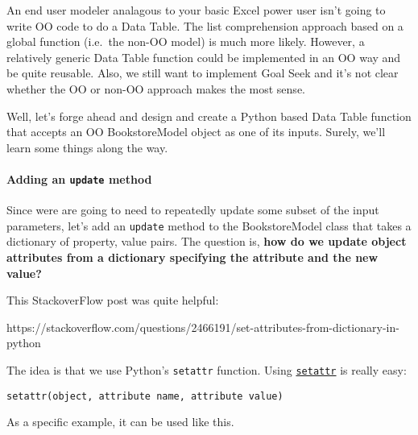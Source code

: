 \documentclass[11pt]{article}
\begin{document}
An end user modeler analagous to your basic Excel power user isn't going
to write OO code to do a Data Table. The list comprehension approach
based on a global function (i.e.~the non-OO model) is much more likely.
However, a relatively generic Data Table function could be implemented
in an OO way and be quite reusable. Also, we still want to implement
Goal Seek and it's not clear whether the OO or non-OO approach makes the
most sense.

Well, let's forge ahead and design and create a Python based Data Table
function that accepts an OO BookstoreModel object as one of its inputs.
Surely, we'll learn some things along the way.

    \hypertarget{adding-an-update-method}{%
\paragraph{\texorpdfstring{Adding an \texttt{update}
method}{Adding an update method}}\label{adding-an-update-method}}

Since were are going to need to repeatedly update some subset of the
input parameters, let's add an \texttt{update} method to the
BookstoreModel class that takes a dictionary of property, value pairs.
The question is, \textbf{how do we update object attributes from a
dictionary specifying the attribute and the new value?}

This StackoverFlow post was quite helpful:

https://stackoverflow.com/questions/2466191/set-attributes-from-dictionary-in-python

The idea is that we use Python's \texttt{setattr} function. Using
\href{https://www.w3schools.com/python/ref_func_setattr.asp}{\texttt{setattr}}
is really easy:

\begin{verbatim}
setattr(object, attribute name, attribute value)
\end{verbatim}

As a specific example, it can be used like this.
\end{document}
